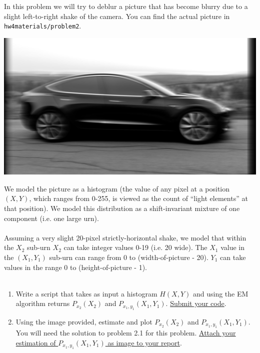 In this problem we will try to deblur a picture that has become blurry due to a slight left-to-right shake of the camera. You can find the actual picture in \texttt{hw4materials/problem2}.
\begin{center}
\includegraphics[scale=0.4]{figs/carblurred.png}
\end{center}
We model the picture as a histogram (the value of any pixel at a position $(X,Y)$, which ranges from 0-255, is viewed as the count of ``light elements'' at that position). We model this distribution as a shift-invariant mixture of one component (i.e. one large urn). 
\\
\\
Assuming a very slight 20-pixel strictly-horizontal shake, we model that within the $X_2$ sub-urn $X_2$ can take integer values 0-19 (i.e. 20 wide). The $X_1$ value in the $(X_1,Y_1)$ sub-urn can range from 0 to (width-of-picture - 20). $Y_1$ can take values in the range 0 to (height-of-picture - 1). 
\\
\\
\begin{enumerate}
    \item Write a script that takes as input a histogram $H(X,Y)$ and using the EM algorithm returns $P_{x_2}(X_2)$ and $P_{x_1,y_1}(X_1, Y_1)$. \ul{Submit your code}.
    \item Using the image provided, estimate and plot $P_{x_2}(X_2)$ and $P_{x_1,y_1}(X_1, Y_1)$. You will need the solution to problem 2.1 for this problem. 
    \ul{Attach your estimation of $P_{x_1,y_1}(X_1, Y_1)$ as image to your report}.
\end{enumerate}






